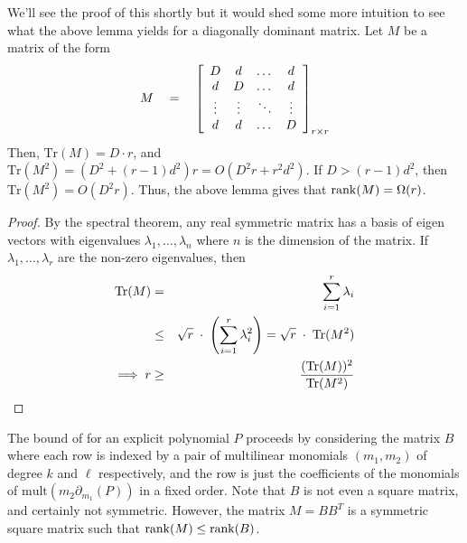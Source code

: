 We'll see the proof of this shortly but it would shed some more intuition to see what the above lemma yields for a diagonally dominant matrix. Let $M$ be a matrix of the form
\[
M \quad = \quad \left[\begin{array}{cccc}
D &  d & \dots &  d\\
 d & D & \dots & d\\
\vdots & \vdots & \ddots & \vdots \\
d & d & \dots & D
\end{array}\right]_{r \times r}
\]
Then, $\mathrm{Tr}(M) = D\cdot r$, and $\mathrm{Tr}(M^2) = (D^2 + (r-1)d^2)r = O(D^2 r + r^2 d^2)$. If $D > (r-1)d^2$, then $\mathrm{Tr}(M^2) = O(D^2r)$. Thus, the above lemma gives that $\mathrm{rank}(M) = \Omega(r)$. 
\begin{proof}
By the spectral theorem, any real symmetric matrix has a basis of eigen vectors with eigenvalues $\lambda_1,\dots, \lambda_n$ where $n$ is the dimension of the matrix. If $\lambda_1,\dots, \lambda_r$ are the non-zero eigenvalues, then 
\begin{eqnarray*}
\mathrm{Tr}(M) &   =  & \sum_{i=1}^r \lambda_i\\
& \leq & \sqrt{r} \;\cdot \; \left(\sum_{i=1}^r \lambda_i^2\right) = \sqrt{r}\;\cdot \; \mathrm{Tr}(M^2)\\
\implies r & \geq & \frac{(\mathrm{Tr}(M))^2}{\mathrm{Tr}(M^2)}
\end{eqnarray*}
\end{proof}

The bound of \cite{KLSS} for an explicit polynomial $P$ proceeds by considering the matrix $B$ where each row is indexed by a pair of multilinear monomials $(m_1,m_2)$  of degree $k$ and $\ell$ respectively, and the row is just the coefficients of the monomials of $\mathrm{mult}(m_2 \partial_{m_1}(P))$ in a fixed order. Note that $B$ is not even a square matrix, and certainly not symmetric. However, the matrix $M = B B^T$ is a symmetric square matrix such that $\mathrm{rank}(M) \leq \mathrm{rank}(B)$. \\

